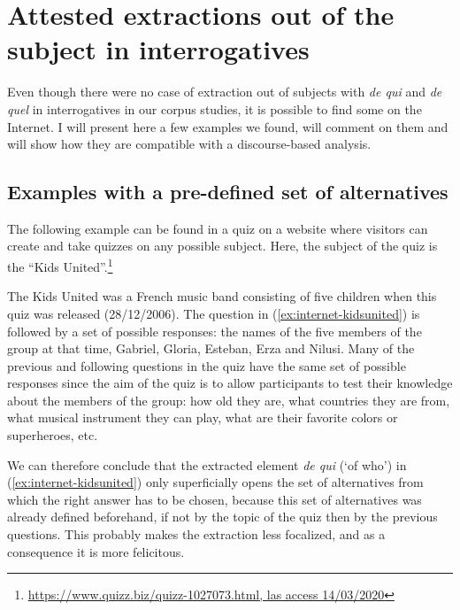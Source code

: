 \section{Attested extractions out of the subject in interrogatives}
\label{ch:attested-questions-subextraction}

Even though there were no case of extraction out of subjects with \emph{de qui} and \emph{de quel} in interrogatives in our corpus studies, it is possible to find some on the Internet. I will present here a few examples we found, will comment on them and will show how they are compatible with a discourse-based analysis.

\subsection{Examples with a pre-defined set of alternatives}

The following example can be found in a quiz on a website where visitors can create and take quizzes on any possible subject. Here, the subject of the quiz is the ``Kids United''.\footnote{\url{https://www.quizz.biz/quizz-1027073.html, las access 14/03/2020}}

\label{ex:internet-kidsunited}
\z 

The Kids United was a French music band consisting of five children when this quiz was released (28/12/2006). The question in (\ref{ex:internet-kidsunited}) is followed by a set of possible responses: the names of the five members of the group at that time, Gabriel, Gloria, Esteban, Erza and Nilusi. 
Many of the previous and following questions in the quiz have the same set of possible responses since the aim of the quiz is to allow participants to test their knowledge about the members of the group: how old they are, what countries they are from, what musical instrument they can play, what are their favorite colors or superheroes, etc.

We can therefore conclude that the extracted element \emph{de qui} (`of who') in (\ref{ex:internet-kidsunited}) only superficially opens the set of alternatives from which the right answer has to be chosen, because this set of alternatives was already defined beforehand, if not by the topic of the quiz then by the previous questions. This probably makes the extraction less focalized, and as a consequence it is more felicitous. 

